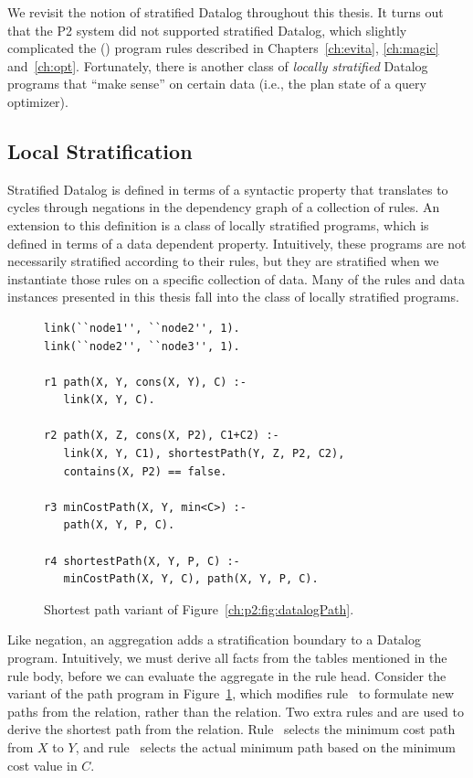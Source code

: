 We revisit the notion of stratified Datalog throughout this thesis.  It turns
out that the P2 system did not supported stratified Datalog, which slightly
complicated the (\OVERLOG) program rules described in Chapters~\ref{ch:evita},
\ref{ch:magic} and~\ref{ch:opt}.  Fortunately, there is another class of {\em
locally stratified} Datalog programs that ``make sense'' on certain data (i.e.,
the plan state of a query optimizer).

\subsection{Local Stratification}

Stratified Datalog is defined in terms of a syntactic property that translates
to cycles through negations in the dependency graph of a collection of rules.
An extension to this definition is a class of locally stratified programs,
which is defined in terms of a data dependent property.  Intuitively, these
programs are not necessarily stratified according to their rules, but they are
stratified when we instantiate those rules on a specific collection of data.
Many of the rules and data instances presented in this thesis fall into the
class of locally stratified programs.

\begin{figure}
\ssp
\begin{lstlisting}
link(``node1'', ``node2'', 1).
link(``node2'', ``node3'', 1).

r1 path(X, Y, cons(X, Y), C) :-
   link(X, Y, C).

r2 path(X, Z, cons(X, P2), C1+C2) :-
   link(X, Y, C1), shortestPath(Y, Z, P2, C2),
   contains(X, P2) == false.

r3 minCostPath(X, Y, min<C>) :-
   path(X, Y, P, C).

r4 shortestPath(X, Y, P, C) :-
   minCostPath(X, Y, C), path(X, Y, P, C).

\end{lstlisting}
\caption{\label{ch:p2:fig:datalogSP}Shortest path variant of Figure~\ref{ch:p2:fig:datalogPath}.}
\end{figure}

Like negation, an aggregation adds a stratification boundary to a Datalog
program.  Intuitively, we must derive all facts from the tables mentioned in
the rule body, before we can evaluate the aggregate in the rule head.
Consider the variant of the path program in Figure~\ref{ch:p2:fig:datalogSP},
which modifies rule~ to formulate new paths from the 
relation, rather than the  relation.  Two extra rules  and
 are used to derive the shortest path from the  relation.
Rule~ selects the minimum cost path from $X$ to $Y$, and rule~
selects the actual minimum path based on the minimum cost value in $C$.

